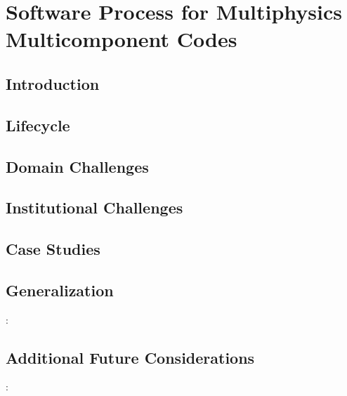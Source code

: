 \documentclass[sunil1]{sunil} %
\begin{document}

\chapter{Software Process for Multiphysics Multicomponent Codes}
\section {Introduction} 

\section{Lifecycle}

\section{Domain Challenges} 

\section{Institutional Challenges}

\section{Case Studies}
\label{sec:case-studies}


\section{Generalization} : 

\section{Additional Future Considerations}: 



\end{document}
